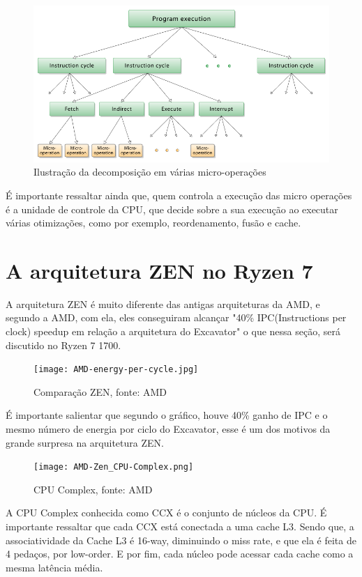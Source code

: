 \documentclass[12pt]{article}
\begin{document}
\begin{figure}[H]
\centering
\includegraphics[width=115mm,scale=0.8]{Micro-operations.png}
\caption{Ilustração da decomposição em várias micro-operações}
\label{fig:AMD CORE}
\end{figure}

É importante ressaltar ainda que, quem controla a execução das micro operações é a unidade de controle da CPU, que decide sobre a sua execução ao executar várias otimizações, como por exemplo, reordenamento, fusão e cache.

\newpage

\section{A arquitetura ZEN no Ryzen 7}

A arquitetura ZEN é muito diferente das antigas arquiteturas da AMD, e segundo a AMD, com ela, eles conseguiram alcançar "40\% IPC(Instructions per clock) speedup em relação a arquitetura do  Excavator" o que nessa seção, será discutido no Ryzen 7 1700.\\

\begin{figure}[H]
\centering
\texttt{[image: AMD-energy-per-cycle.jpg]}
\caption{Comparação ZEN, fonte: AMD}
\label{fig:AMD CORE}
\end{figure}

É importante salientar que segundo o gráfico, houve 40\% ganho de IPC e o mesmo número de energia por ciclo do Excavator, esse é um dos motivos da grande surpresa na arquitetura ZEN.


\begin{figure}[H]
\centering
\texttt{[image: AMD-Zen\_CPU-Complex.png]}
\caption{CPU Complex, fonte: AMD}
\label{fig:AMD CORE}
\end{figure}

A CPU Complex conhecida como CCX é o conjunto de núcleos da CPU. É importante ressaltar que cada CCX está conectada a uma cache L3. Sendo que, a associatividade da Cache L3 é 16-way, diminuindo o miss rate, e que ela é feita de 4 pedaços, por low-order. E por fim, cada núcleo pode acessar cada cache como a mesma latência média.
\end{document}
